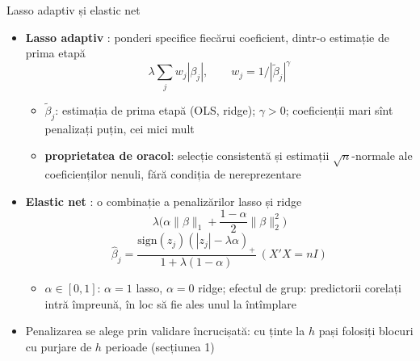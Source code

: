 \begin{frame}{Lasso adaptiv și elastic net}
\itemsize{\small}
\begin{itemize}
    \item \textbf{Lasso adaptiv} : ponderi specifice fiecărui coeficient, dintr-o estimație de prima etapă
    \[ \lambda\sum_j w_j|\beta_j|, \qquad w_j = 1/|\tilde\beta_j|^\gamma \]
    \begin{itemize}
        \item $\tilde\beta_j$: estimația de prima etapă (OLS, ridge); $\gamma > 0$; coeficienții mari sînt penalizați puțin, cei mici mult
        \item \textbf{proprietatea de oracol}: selecție consistentă și estimații $\sqrt n$-normale ale coeficienților nenuli, fără condiția de nereprezentare
    \end{itemize}
    \item \textbf{Elastic net} : o combinație a penalizărilor lasso și ridge
    \[ \lambda\Big(\alpha\|\beta\|_1 + \frac{1 - \alpha}2\|\beta\|_2^2\Big) \]
    \[ \hat\beta_j = \frac{\mathrm{sign}(z_j)(|z_j| - \lambda\alpha)_+}{1 + \lambda(1 - \alpha)} \ (X'X = nI) \]
    \begin{itemize}
        \item $\alpha \in [0, 1]$: $\alpha = 1$ lasso, $\alpha = 0$ ridge; efectul de grup: predictorii corelați intră împreună, în loc să fie ales unul la întîmplare
    \end{itemize}
    \item Penalizarea se alege prin validare încrucișată: cu ținte la $h$ pași folosiți blocuri cu purjare de $h$ perioade (secțiunea 1)
\end{itemize}
\end{frame}

